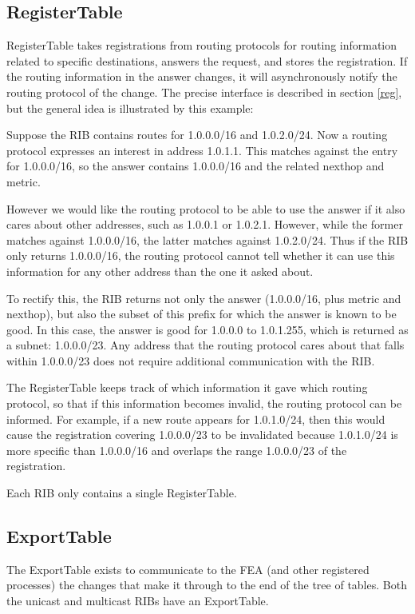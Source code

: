 \documentclass[11pt]{article}
\begin{document}
\subsection{RegisterTable}

RegisterTable takes registrations from routing protocols for routing
information related to specific destinations, answers the request, and
stores the registration.  If the routing information in the
answer changes, it will asynchronously notify the routing protocol of
the change.  The precise interface is described in section \ref{reg},
but the general idea is illustrated by this example:

Suppose the RIB contains routes for 1.0.0.0/16 and 1.0.2.0/24.  Now a
routing protocol expresses an interest in address 1.0.1.1.  This
matches against the entry for 1.0.0.0/16, so the answer contains
1.0.0.0/16 and the related nexthop and metric.

However we would like the routing protocol to be able to use the
answer if it also cares about other addresses, such as 1.0.0.1 or
1.0.2.1.  However, while the former matches against 1.0.0.0/16, the
latter matches against 1.0.2.0/24.  Thus if the RIB only returns
1.0.0.0/16, the routing protocol cannot tell whether it can use this
information for any other address than the one it asked about.

To rectify this, the RIB returns not only the answer (1.0.0.0/16, plus
metric and nexthop), but also the subset of this prefix for which the
answer is known to be good.  In this case, the answer is good for
1.0.0.0 to 1.0.1.255, which is returned as a subnet: 1.0.0.0/23.
Any address that the routing protocol cares about that falls within
1.0.0.0/23 does not require additional communication with the RIB.

The RegisterTable keeps track of which information it gave which
routing protocol, so that if this information becomes invalid, the
routing protocol can be informed.  For example, if a new route appears
for 1.0.1.0/24, then this would cause the registration covering
1.0.0.0/23 to be invalidated because 1.0.1.0/24 is more specific than
1.0.0.0/16 and overlaps the range 1.0.0.0/23 of the registration.

Each RIB only contains a single RegisterTable.

\subsection{ExportTable}

The ExportTable exists to communicate to the FEA (and other registered
processes) the changes that make it through to the end of the tree of
tables.  Both the unicast and multicast RIBs have an ExportTable.
\end{document}
